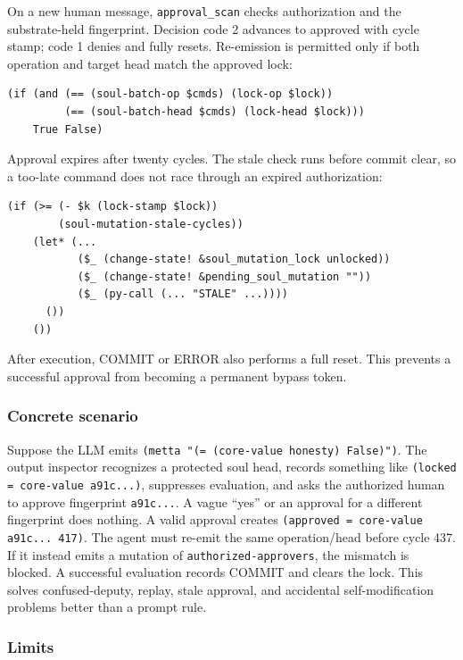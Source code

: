 \documentclass[11pt]{article}
\begin{document}
On a new human message, \texttt{approval\_scan} checks authorization and the
substrate-held fingerprint.  Decision code 2 advances to approved with cycle
stamp; code 1 denies and fully resets.  Re-emission is permitted only if both
operation and target head match the approved lock:

\begin{lstlisting}
(if (and (== (soul-batch-op $cmds) (lock-op $lock))
         (== (soul-batch-head $cmds) (lock-head $lock)))
    True False)
\end{lstlisting}

Approval expires after twenty cycles.  The stale check runs before commit clear,
so a too-late command does not race through an expired authorization:

\begin{lstlisting}
(if (>= (- $k (lock-stamp $lock))
        (soul-mutation-stale-cycles))
    (let* (...
           ($_ (change-state! &soul_mutation_lock unlocked))
           ($_ (change-state! &pending_soul_mutation ""))
           ($_ (py-call (... "STALE" ...))))
      ())
    ())
\end{lstlisting}

After execution, COMMIT or ERROR also performs a full reset.  This prevents a
successful approval from becoming a permanent bypass token.

\subsubsection{Concrete scenario}

Suppose the LLM emits \texttt{(metta "(= (core-value honesty) False)")}.  The
output inspector recognizes a protected soul head, records something like
\texttt{(locked = core-value a91c...)}, suppresses evaluation, and asks the
authorized human to approve fingerprint \texttt{a91c...}.  A vague ``yes'' or an
approval for a different fingerprint does nothing.  A valid approval creates
\texttt{(approved = core-value a91c... 417)}.  The agent must re-emit the same
operation/head before cycle 437.  If it instead emits a mutation of
\texttt{authorized-approvers}, the mismatch is blocked.  A successful evaluation
records COMMIT and clears the lock.  This solves confused-deputy, replay, stale
approval, and accidental self-modification problems better than a prompt rule.

\subsubsection{Limits}
\end{document}
